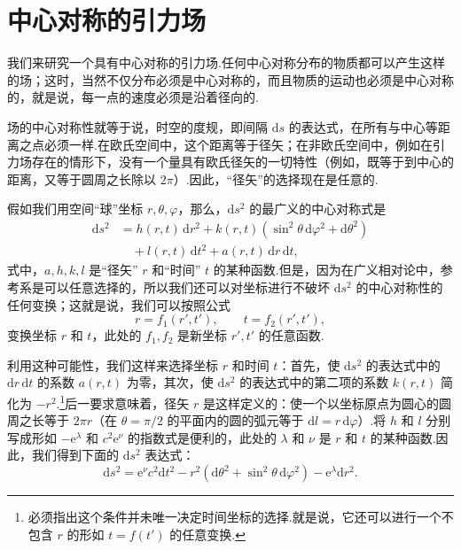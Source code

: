 \section{中心对称的引力场}

我们来研究一个具有中心对称的引力场.任何中心对称分布的物质都可以产生这样的场；这时，当然不仅分布必须是中心对称的，而且物质的运动也必须是中心对称的，就是说，每一点的速度必须是沿着径向的.

场的中心对称性就等于说，时空的度规，即间隔 $\mathrm{d}s$ 的表达式，在所有与中心等距离之点必须一样.在欧氏空间中，这个距离等于径矢；在非欧氏空间中，例如在引力场存在的情形下，没有一个量具有欧氏径矢的一切特性（例如，既等于到中心的距离，又等于圆周之长除以 $2\pi$）.因此，“径矢”的选择现在是任意的.

假如我们用空间“球”坐标 $r,\theta,\varphi$，那么，$\mathrm{d}s^{2}$ 的最广义的中心对称式是
\begin{equation}
\begin{aligned}
  \mathrm{d}s^{2}&=h(r,t)\,\mathrm{d}r^{2}
  +k(r,t)(\sin^{2}\theta\,\mathrm{d}\varphi^{2}+\mathrm{d}\theta^{2})\\
  &\quad+l(r,t)\,\mathrm{d}t^{2}+a(r,t)\,\mathrm{d}r\,\mathrm{d}t,
\end{aligned}
\end{equation}
式中，$a,h,k,l$ 是“径矢” $r$ 和“时间” $t$ 的某种函数.但是，因为在广义相对论中，参考系是可以任意选择的，所以我们还可以对坐标进行不破坏 $\mathrm{d}s^{2}$ 的中心对称性的任何变换；这就是说，我们可以按照公式
\begin{equation*}
  r=f_1(r',t'),\qquad t=f_2(r',t'),
\end{equation*}
变换坐标 $r$ 和 $t$，此处的 $f_1,f_2$ 是新坐标 $r',t'$ 的任意函数.

利用这种可能性，我们这样来选择坐标 $r$ 和时间 $t$：首先，使 $\mathrm{d}s^{2}$ 的表达式中的 $\mathrm{d}r\,\mathrm{d}t$ 的系数 $a(r,t)$ 为零，其次，使 $\mathrm{d}s^{2}$ 的表达式中的第二项的系数 $k(r,t)$ 简化为 $-r^{2}$.\footnote{必须指出这个条件并未唯一决定时间坐标的选择.就是说，它还可以进行一个不包含 $r$ 的形如 $t=f(t')$ 的任意变换.}后一要求意味着，径矢 $r$ 是这样定义的：使一个以坐标原点为圆心的圆周之长等于 $2\pi r$（在 $\theta=\pi/2$ 的平面内的圆的弧元等于 $\mathrm{d}l=r\,\mathrm{d}\varphi$）.将 $h$ 和 $l$ 分别写成形如 $-\mathrm{e}^{\lambda}$ 和 $c^{2}\mathrm{e}^{\nu}$ 的指数式是便利的，此处的 $\lambda$ 和 $\nu$ 是 $r$ 和 $t$ 的某种函数.因此，我们得到下面的 $\mathrm{d}s^{2}$ 表达式：
\begin{equation}
  \mathrm{d}s^{2}=\mathrm{e}^{\nu}c^{2}\mathrm{d}t^{2}
  -r^{2}(\mathrm{d}\theta^{2}+\sin^{2}\theta\,\mathrm{d}\varphi^{2})
  -\mathrm{e}^{\lambda}\mathrm{d}r^{2}.
\end{equation}

